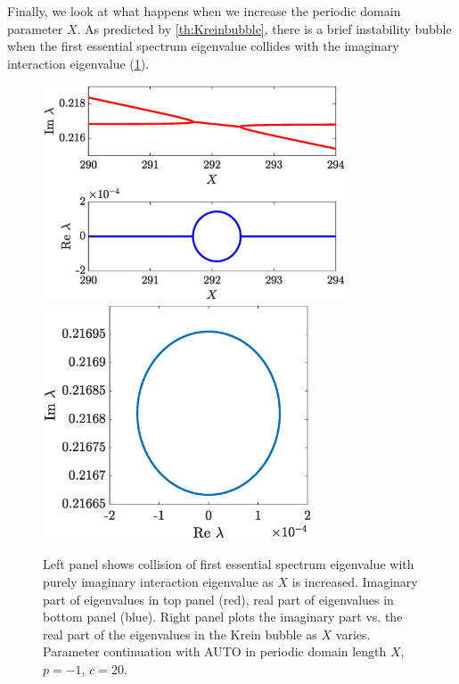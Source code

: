 \documentclass[12pt]{elsarticle}
\theoremstyle{plain}
\theoremstyle{definition}
\theoremstyle{remark}
\numberwithin{theorem}{section}
\numberwithin{equation}{section}
\begin{document}
Finally, we look at what happens when we increase the periodic domain parameter $X$. As predicted by \cref{th:Kreinbubble}, there is a brief instability bubble when the first essential spectrum eigenvalue collides with the imaginary interaction eigenvalue (\cref{fig:kreinbubble1}).
\begin{figure}
\begin{center}
\includegraphics[width=9cm]{images/kreinbubble1}
\hspace{-0.75cm}
\includegraphics[width=8cm]{images/kreinbubble1zoom.eps}
\end{center}
\caption{Left panel shows collision of first essential spectrum eigenvalue with purely imaginary interaction eigenvalue as $X$ is increased. Imaginary part of eigenvalues in top panel (red), real part of eigenvalues in bottom panel (blue). Right panel plots the imaginary part vs. the real part of the eigenvalues in the Krein bubble as $X$ varies. Parameter continuation with AUTO in periodic domain length $X$, $p = -1$, $c = 20$.}
\label{fig:kreinbubble1}
\end{figure}
\end{document}
